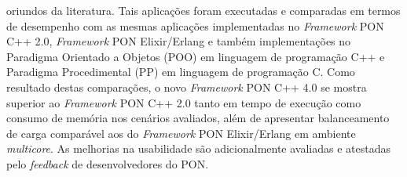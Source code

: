 \begin{resumoutfpr}
oriundos da literatura. Tais aplicações foram executadas e comparadas em termos
de desempenho com as mesmas aplicações implementadas no \textit{Framework} PON
C++ 2.0, \textit{Framework} PON Elixir/Erlang e também implementações no
Paradigma Orientado a Objetos (POO) em linguagem de programação C++ e Paradigma
Procedimental (PP) em linguagem de programação C. Como resultado destas
comparações, o novo \textit{Framework} PON C++ 4.0 se mostra superior ao
\textit{Framework} PON C++ 2.0 tanto em tempo de execução como consumo de
memória nos cenários avaliados, além de apresentar balanceamento de carga
comparável aos do \textit{Framework} PON Elixir/Erlang em ambiente
\textit{multicore}. As melhorias na usabilidade são adicionalmente avaliadas e
atestadas pelo \textit{feedback} de desenvolvedores do PON.
\end{resumoutfpr}
